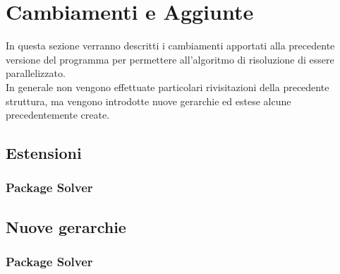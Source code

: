 % 
%
%

\section{Cambiamenti e Aggiunte}
In questa sezione verranno descritti i cambiamenti apportati alla precedente versione del programma per permettere all'algoritmo di risoluzione di essere parallelizzato. \\
In generale non vengono effettuate particolari rivisitazioni della precedente struttura, ma vengono introdotte nuove gerarchie ed estese alcune precedentemente create.

	\subsection{Estensioni} %
	\label{sub:estensioni}
		\subsubsection{Package Solver} %
		\label{ssub:package_solver}
		
	
	\subsection{Nuove gerarchie} %
	\label{sub:nuove_gerarchie}
		\subsubsection{Package Solver} %
		\label{ssub:package_solver}
		

